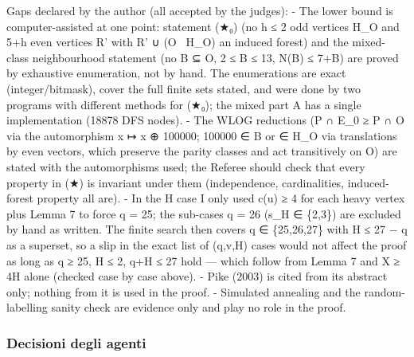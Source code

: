 \documentclass[11pt,a4paper]{article}
\begin{document}
Gaps declared by the author (all accepted by the judges): - The lower
bound is computer-assisted at one point: statement (★₀) (no h ≤ 2 odd
vertices H\_O and 5+h even vertices R' with R' ∪ (O ~H\_O) an induced
forest) and the mixed-class neighbourhood statement (no B ⊆ O, 2 ≤
\textbar B\textbar{} ≤ 13, \textbar N(B)\textbar{} ≤
7+\textbar B\textbar) are proved by exhaustive enumeration, not by hand.
The enumerations are exact (integer/bitmask), cover the full finite sets
stated, and were done by two programs with different methods for (★₀);
the mixed part A has a single implementation (18878 DFS nodes). - The
WLOG reductions (\textbar P ∩ E\_0\textbar{} ≥ \textbar P ∩ O\textbar{}
via the automorphism x ↦ x ⊕ 100000; 100000 ∈ B or ∈ H\_O via
translations by even vectors, which preserve the parity classes and act
transitively on O) are stated with the automorphisms used; the Referee
should check that every property in (★) is invariant under them
(independence, cardinalities, induced-forest property all are). - In the
\textbar H case I only used c(u) ≥ 4 for each heavy vertex
plus Lemma 7 to force q = 25; the sub-cases q = 26 (s\_H ∈ \{2,3\}) are
excluded by hand as written. The finite search then covers q ∈
\{25,26,27\} with \textbar H\textbar{} ≤ 27 − q as a superset, so a slip
in the exact list of (q,v,\textbar H\textbar) cases would not affect the
proof as long as q ≥ 25, \textbar H\textbar{} ≤ 2,
q+\textbar H\textbar{} ≤ 27 hold --- which follow from Lemma 7 and X ≥
4\textbar H\textbar{} alone (checked case by case above). - Pike (2003)
is cited from its abstract only; nothing from it is used in the proof. -
Simulated annealing and the random-labelling sanity check are evidence
only and play no role in the proof.

\subsubsection{Decisioni degli agenti}
\end{document}
